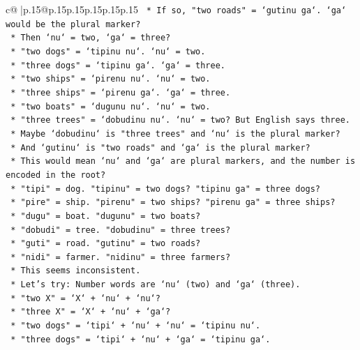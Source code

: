 \documentclass{article}
\begin{document}
{\begin{supertabular}{c@{$\;$}|p{.15\linewidth}@{}p{.15\linewidth}p{.15\linewidth}p{.15\linewidth}p{.15\linewidth}p{.15\linewidth}}
{{{\texttt{            *   If so, "two roads" = `gutinu ga`. `ga` would be the plural marker?} \\
\texttt{            *   Then `nu` = two, `ga` = three?} \\
\texttt{            *   "two dogs" = `tipinu nu`. `nu` = two.} \\
\texttt{            *   "three dogs" = `tipinu ga`. `ga` = three.} \\
\texttt{            *   "two ships" = `pirenu nu`. `nu` = two.} \\
\texttt{            *   "three ships" = `pirenu ga`. `ga` = three.} \\
\texttt{            *   "two boats" = `dugunu nu`. `nu` = two.} \\
\texttt{            *   "three trees" = `dobudinu nu`. `nu` = two? But English says three.} \\
\texttt{            *   Maybe `dobudinu` is "three trees" and `nu` is the plural marker?} \\
\texttt{            *   And `gutinu` is "two roads" and `ga` is the plural marker?} \\
\texttt{            *   This would mean `nu` and `ga` are plural markers, and the number is encoded in the root?} \\
\texttt{            *   "tipi" = dog. "tipinu" = two dogs? "tipinu ga" = three dogs?} \\
\texttt{            *   "pire" = ship. "pirenu" = two ships? "pirenu ga" = three ships?} \\
\texttt{            *   "dugu" = boat. "dugunu" = two boats?} \\
\texttt{            *   "dobudi" = tree. "dobudinu" = three trees?} \\
\texttt{            *   "guti" = road. "gutinu" = two roads?} \\
\texttt{            *   "nidi" = farmer. "nidinu" = three farmers?} \\
\texttt{            *   This seems inconsistent.} \\
\texttt{            *   Let's try: Number words are `nu` (two) and `ga` (three).} \\
\texttt{            *   "two X" = `X` + `nu` + `nu`?} \\
\texttt{            *   "three X" = `X` + `nu` + `ga`?} \\
\texttt{            *   "two dogs" = `tipi` + `nu` + `nu` = `tipinu nu`.} \\
\texttt{            *   "three dogs" = `tipi` + `nu` + `ga` = `tipinu ga`.} \\
}}}
\end{supertabular}}
\end{document}
